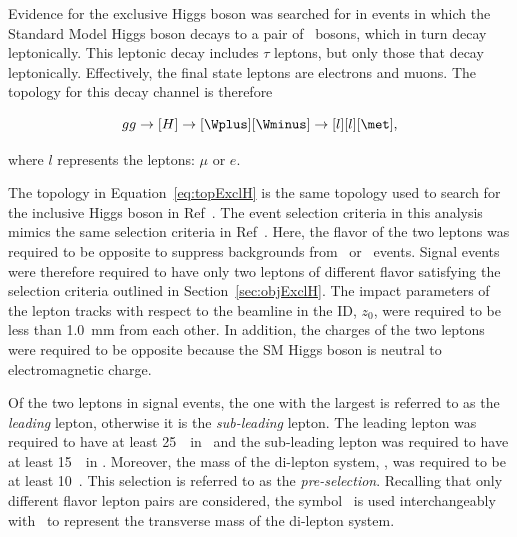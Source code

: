\par Evidence for the exclusive Higgs boson was searched for in events in which the Standard Model 
Higgs boson decays to a pair of \Wpm\ bosons, which in turn decay leptonically. This leptonic 
decay includes $\tau$ leptons, but only those that decay leptonically. Effectively, the final state leptons 
are electrons and muons. The topology for this decay channel is therefore 

\begin{equation}
gg\to[H]\to[\Wplus][\Wminus]\to[l][l][\met],
\label{eq:topExclH}
\end{equation} 
 
where $l$ represents the leptons: $\mu$ or $e$. 

\par The topology in Equation~\ref{eq:topExclH} is the same topology used to search for the inclusive 
Higgs boson in Ref~\cite{ATLAS:2014aga}. The event selection criteria in this analysis mimics the same 
selection criteria in Ref~\cite{ATLAS:2014aga}. Here, the flavor of the two leptons was required to be 
opposite to suppress backgrounds from \Zee\ or \Zmm\ events. Signal events were therefore required to have only 
two leptons of different flavor satisfying the selection criteria outlined in Section~\ref{sec:objExclH}.
The impact parameters of the lepton tracks with respect to the beamline in the ID, $z_0$, 
were required to be less than 1.0~mm from each other. In addition, the charges of the two leptons 
were required to be opposite because the SM Higgs boson is neutral to electromagnetic charge.  

\par Of the two leptons in signal events, the one with the largest \pt is referred to as the {\it leading} 
lepton, otherwise it is the {\it sub-leading} lepton. The leading lepton was required to have at least 
25~\GeV\ in \pt\ and the sub-leading lepton was required to have at least 15~\GeV\ in \pt. Moreover, the mass 
of the di-lepton system, \mll, was required to be at least 10~\GeV. 
This selection is referred to as the {\it pre-selection}.
Recalling that only different flavor lepton 
pairs are considered, the symbol \mll\ is used interchangeably with \memu\ to represent the transverse 
mass of the di-lepton system.

